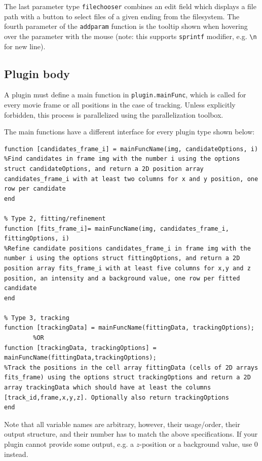 \documentclass[11pt,onside]{report}
\numberwithin{equation}{chapter}
\begin{document}
The last parameter type \texttt{filechooser} combines an edit field which displays a file path with a button to select files of a given ending from the filesystem. The fourth parameter of the \texttt{add\textunderscore param} function is the tooltip shown when hovering over the parameter with the mouse (note: this supports \texttt{sprintf} modifier, e.g. \texttt{\textbackslash{}n} for new line). 

\subsection{Plugin body}
A plugin must define a main function in \texttt{plugin.mainFunc}, which is called for every movie frame or all positions in the case of tracking. Unless explicitly forbidden, this process is parallelized using the parallelization toolbox.

The main functions have a different interface for every plugin type shown below:
\begin{lstlisting}[style=Matlab-editor]
% Type 1, candidate detection
function [candidates_frame_i] = mainFuncName(img, candidateOptions, i)
%Find candidates in frame img with the number i using the options struct candidateOptions, and return a 2D position array candidates_frame_i with at least two columns for x and y position, one row per candidate
end
  
% Type 2, fitting/refinement
function [fits_frame_i]= mainFuncName(img, candidates_frame_i, fittingOptions, i)
%Refine candidate positions candidates_frame_i in frame img with the number i using the options struct fittingOptions, and return a 2D position array fits_frame_i with at least five columns for x,y and z position, an intensity and a background value, one row per fitted candidate
end

% Type 3, tracking
function [trackingData] = mainFuncName(fittingData, trackingOptions);
        %OR
function [trackingData, trackingOptions] = mainFuncName(fittingData,trackingOptions);
%Track the positions in the cell array fittingData (cells of 2D arrays fits_frame) using the options struct trackingOptions and return a 2D array trackingData which should have at least the columns [track_id,frame,x,y,z]. Optionally also return trackingOptions
end
\end{lstlisting}
Note that all variable names are arbitrary, however, their usage/order, their output structure, and their number has to match the above specifications. If your plugin cannot provide some output, e.g. a $z$-position or a background value, use 0 instead. 
\end{document}
